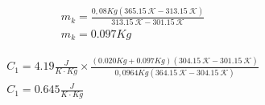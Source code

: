 \documentclass[letterpaper, 12pt]{article}
\begin{document}
\begin{equation*}
      \begin{gathered}
            m_k = \frac{0,08 Kg(365.15~\mathcal{K} - 313.15~\mathcal{K})}{313.15~\mathcal{K} - 301.15~\mathcal{K}} \\
            m_k = 0.097 Kg
      \end{gathered}
\end{equation*}

\begin{equation*}
      \begin{gathered}
            C_{1} = 4.19 \frac{J}{K \cdot Kg} \times \frac{(0.020 Kg + 0.097 Kg)(304.15~\mathcal{K} - 301.15~\mathcal{K})}{0,0964 Kg(364.15~\mathcal{K} - 304.15~\mathcal{K})} \\
            C_{1} = 0.645 \frac{J}{K \cdot Kg}
      \end{gathered}
\end{equation*}

\subsubsection{}
\end{document}
